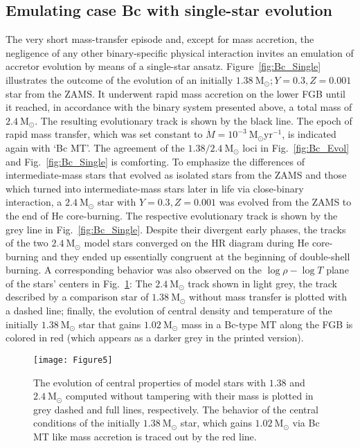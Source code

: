 \documentclass[a4paper,fleqn,usenatbib]{mnras}
\newcommand{\msol}{~\mathrm{M}_\odot}
\begin{document}
\subsection{Emulating case Bc with single-star evolution}
\label{sect:SingleStar_Bc}
The very short mass-transfer episode and, except for mass accretion, the negligence 
of any other binary-specific physical interaction invites an emulation of accretor
evolution by means of a single-star ansatz. Figure~\ref{fig:Bc_Single} illustrates the
outcome of the evolution of an initially $1.38 \msol; Y=0.3, Z=0.001$ star from the ZAMS. 
It underwent rapid mass accretion on the lower FGB until it reached, in accordance with 
the binary system presented above, a total mass of $2.4 \msol$. The resulting evolutionary track
is shown by the black line. The epoch of rapid mass transfer, which was set constant to 
$\dot{M} = 10^{-3} \msol \mathrm{yr}^{-1}$, is indicated again with `Bc MT'. 
The agreement of the $1.38/2.4 \msol$ loci in Fig.~\ref{fig:Bc_Evol} and Fig.~\ref{fig:Bc_Single} 
is comforting. To emphasize the differences of intermediate-mass stars that 
evolved as isolated stars from the ZAMS  and those which turned into 
intermediate-mass stars later in life via close-binary interaction, 
a $2.4 \msol$ star with $Y=0.3, Z=0.001$ was evolved from the ZAMS to the end of He core-burning. 
The respective evolutionary track is  shown by the grey line in Fig.~\ref{fig:Bc_Single}. 
Despite their divergent early phases, the tracks 
of the two $2.4 \msol$ model stars converged on the HR diagram  
during He core-burning and they ended up essentially congruent at the
beginning of double-shell burning. A corresponding behavior was also observed on 
the $\log \rho - \log T$ plane of the stars' centers in Fig.~\ref{fig:Bc_SingleRhoT}: 
The $2.4 \msol$ track shown in light grey, the track described by a 
comparison star of $1.38 \msol$ without mass transfer is plotted with a dashed line; 
finally, the evolution of central density and temperature of the initially $1.38 \msol$ star
that gains $1.02 \msol$ mass in a Bc-type MT along the FGB is colored in red 
(which appears as a darker grey in the printed version). 
\begin{figure}
	\texttt{[image: Figure5]}
    \caption{The evolution of central properties of model stars with $1.38$ and $2.4 \msol$
    	     computed without tampering with their mass is plotted in grey dashed 
    	     and full lines, respectively. The behavior of the central conditions of the 
    	     initially $1.38 \msol$ star, which gains 
    	     $1.02 \msol$ via Bc MT like mass accretion is traced out by the red line.  
    	    }
    \label{fig:Bc_SingleRhoT}
\end{figure}
\end{document}
